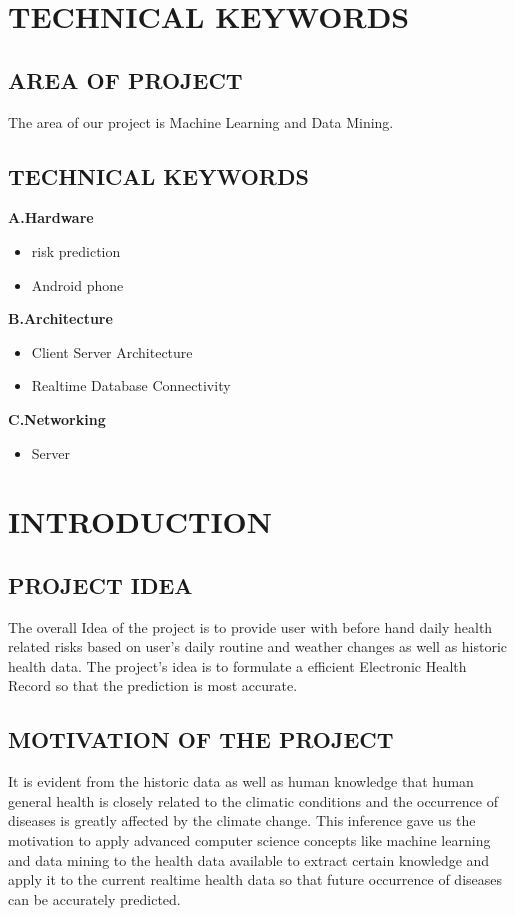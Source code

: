 \documentclass[12pt,a4paper]{report}
\begin{document}
\chapter{\bf{TECHNICAL KEYWORDS}}
\newpage

\section{AREA OF PROJECT}
The area of our project is Machine Learning and Data Mining.
\section{TECHNICAL KEYWORDS}
\textbf{A.Hardware}
\begin{itemize}
	\item risk prediction
	\item Android phone
\end{itemize}
\textbf{B.Architecture}
\begin{itemize}
	\item Client Server Architecture
	\item Realtime Database Connectivity
\end{itemize}
\textbf{C.Networking}
\begin{itemize}
	\item Server 
\end{itemize}


\chapter{INTRODUCTION}
\newpage

\section{PROJECT IDEA}
The overall Idea of the project is to provide user with before hand daily health related risks based on user's daily routine and weather changes as well as historic health data. The project's idea is to formulate a efficient Electronic Health Record so that the prediction is most accurate. 

\section{MOTIVATION OF THE PROJECT}
It is evident from the historic data as well as human knowledge that human general health is closely related to the climatic conditions and the occurrence of diseases is greatly affected by the climate change. This inference gave us the motivation to apply advanced computer science concepts like machine learning and data mining to the health data available to extract certain knowledge and apply it to the current realtime health data so that future occurrence of diseases can be accurately predicted.
\end{document}
